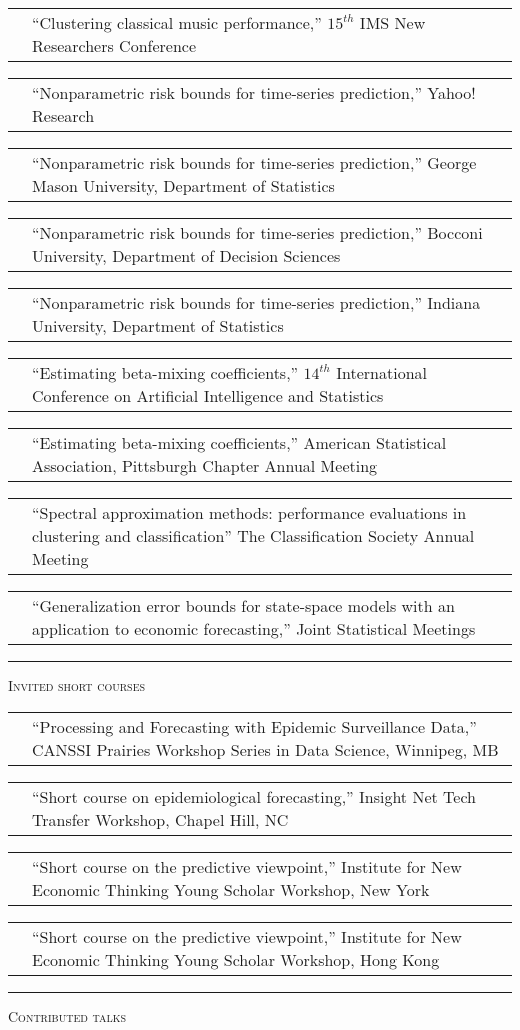 \documentclass[11pt,letterpaper]{minimal/moderncv}
\makeatletter
\renewcommand{\section}[1]{  \par\addvspace{15pt}%
  \parbox[t]{\hintscolumnwidth}{\strut\raggedleft\raisebox{4pt}%
  {\rule{\hintscolumnwidth}{2pt}}}%
  \hspace{\separatorcolumnwidth}%
  \textsc{\Large #1}\par\nobreak\addvspace{6pt}%
}
\renewcommand*{\cvitem}[2]{%
  \begin{tabular}{@{}p{\hintscolumnwidth}@{\hspace{\separatorcolumnwidth}}%
    p{\maincolumnwidth}@{}}%
    \raggedleft {#1} &  {#2}%
  \end{tabular}%
}
\makeatother
\begin{document}
\cvitem{2013}{ ``Clustering classical music performance,'' $15^{th}$ IMS New Researchers Conference}

\cvitem{2012}{``Nonparametric risk bounds for time-series
  prediction,'' Yahoo! Research} 

\cvitem{}{``Nonparametric risk bounds for time-series prediction,'' George
  Mason University, Department of Statistics}

\cvitem{}{``Nonparametric risk bounds for time-series prediction,''
  Bocconi University, Department of Decision Sciences}

\cvitem{}{``Nonparametric risk bounds for time-series prediction,''
  Indiana University, Department of Statistics}

\cvitem{}{``Estimating beta-mixing coefficients,'' $14^{th}$
  International Conference on Artificial Intelligence and Statistics}

\cvitem{}{``Estimating beta-mixing coefficients,'' American Statistical
  Association, Pittsburgh Chapter Annual Meeting} 

\cvitem{}{``Spectral approximation methods: performance evaluations in
  clustering and classification'' The Classification Society Annual Meeting}

\cvitem{2010}{``Generalization error bounds for state-space models with an
  application to economic forecasting,''
  Joint Statistical Meetings}

\section{Invited short courses}

\cvitem{2025}{``Processing and Forecasting with Epidemic Surveillance Data,'' CANSSI Prairies Workshop Series in Data Science, Winnipeg, MB}

\cvitem{2024}{``Short course on epidemiological forecasting,'' Insight Net Tech Transfer Workshop, Chapel Hill, NC}

\cvitem{2015}{``Short course on the predictive viewpoint,''
  Institute for New Economic Thinking Young Scholar Workshop,
  New York}

\cvitem{2013}{``Short course on the predictive viewpoint,'' Institute for New
  Economic Thinking Young Scholar Workshop, 
  Hong Kong}
    
    
    
\section{Contributed talks}
\end{document}
